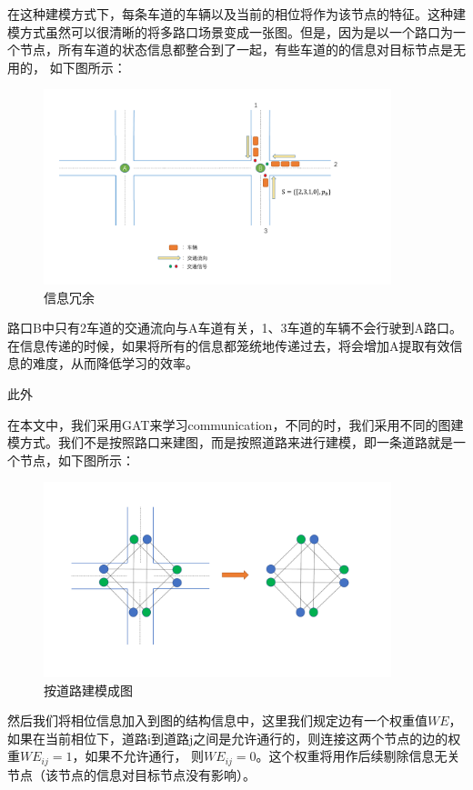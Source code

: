 在这种建模方式下，每条车道的车辆以及当前的相位将作为该节点的特征。这种建模方式虽然可以很清晰的将多路口场景变成一张图。但是，因为是以一个路口为一个节点，所有车道的状态信息都整合到了一起，有些车道的的信息对目标节点是无用的，
如下图所示：
\begin{figure}[htb]
  \includegraphics[width=0.9\textwidth]{ppt/information-redundancy.pdf}
  \caption{信息冗余}
  \label{fig:information-redundancy}
\end{figure}

路口B中只有2车道的交通流向与A车道有关，1、3车道的车辆不会行驶到A路口。在信息传递的时候，如果将所有的信息都笼统地传递过去，将会增加A提取有效信息的难度，从而降低学习的效率。

此外


在本文中，我们采用GAT来学习communication，不同的时，我们采用不同的图建模方式。我们不是按照路口来建图，而是按照道路来进行建模，即一条道路就是一个节点，如下图所示：
\begin{figure}[htb]
  \includegraphics[width=0.9\textwidth]{ppt/graph-modeling.pdf}
  \caption{按道路建模成图}
  \label{fig:network-graph-new}
\end{figure}

然后我们将相位信息加入到图的结构信息中，这里我们规定边有一个权重值$WE$，如果在当前相位下，道路i到道路j之间是允许通行的，则连接这两个节点的边的权重$WE_{ij}=1$，如果不允许通行，
则$WE_{ij}=0$。这个权重将用作后续剔除信息无关节点（该节点的信息对目标节点没有影响）。


